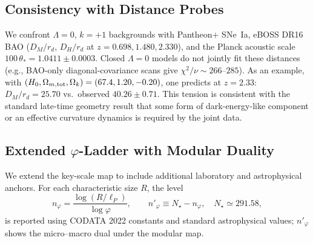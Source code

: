 \documentclass[aps,prd,reprint,onecolumn,nofootinbib]{revtex4-2}
\begin{document}
\subsection{Consistency with Distance Probes}
We confront $\Lambda=0$, $k=+1$ backgrounds with Pantheon$+$ SNe~Ia, eBOSS DR16 BAO ($D_M/r_d$, $D_H/r_d$ at $z=0.698, 1.480, 2.330$), and the Planck acoustic scale $100\,\theta_\ast=1.0411\pm 0.0003$. Closed $\Lambda=0$ models do not jointly fit these distances (e.g., BAO-only diagonal-covariance scans give $\chi^2/\nu\sim 266$--$285$). As an example, with $(H_0,\Omega_{m,{\rm tot}},\Omega_k)=(67.4,1.20,-0.20)$, one predicts at $z=2.33$: $D_M/r_d=25.70$ vs.\ observed $40.26\pm 0.71$. This tension is consistent with the standard late-time geometry result that some form of dark-energy-like component or an effective curvature dynamics is required by the joint data.

\subsection{Extended $\varphi$-Ladder with Modular Duality}
We extend the key-scale map to include additional laboratory and astrophysical anchors. For each characteristic size $R$, the level
\begin{equation}
n_\varphi=\frac{\log(R/\ell_P)}{\log \varphi},\qquad n'_\varphi \equiv N_\star - n_\varphi,\quad N_\star\simeq 291.58,
\end{equation}
is reported using CODATA 2022 constants and standard astrophysical values; $n'_\varphi$ shows the micro--macro dual under the modular map.
\end{document}
